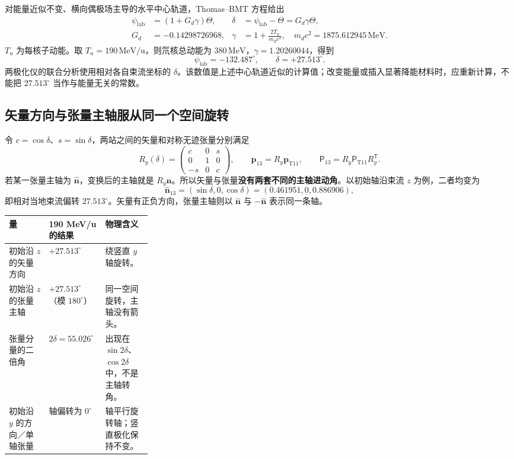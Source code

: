 \documentclass[UTF8,11pt,a4paper,fontset=none]{ctexart}
\newcommand{\pvec}{\bm p}
\newcommand{\Pt}{\mathsf P}
\begin{document}
对能量近似不变、横向偶极场主导的水平中心轨道，Thomas--BMT 方程给出\cite{bmt,constants}
\begin{align}
 \psi_{\mathrm{lab}}&=(1+G_d\gamma)\Theta,&
 \delta&=\psi_{\mathrm{lab}}-\Theta=G_d\gamma\Theta,\\
 G_d&=-0.14298726968,&
 \gamma&=1+\frac{2T_u}{m_dc^2},\quad m_dc^2=1875.612945\,\mathrm{MeV}.
\end{align}
$T_u$ 为每核子动能。取 $T_u=190\,\mathrm{MeV/u}$，则氘核总动能为 $380\,\mathrm{MeV}$，$\gamma=1.20260044$，得到
\begin{equation}
 \boxed{\psi_{\mathrm{lab}}=-132.487^\circ,\qquad
 \delta=+27.513^\circ.}
\end{equation}
两极化仪的联合分析使用相对各自束流坐标的 $\delta$。该数值是上述中心轨道近似的计算值；改变能量或插入显著降能材料时，应重新计算，不能把 $27.513^\circ$ 当作与能量无关的常数。

\subsection{矢量方向与张量主轴服从同一个空间旋转}

令 $c=\cos\delta$、$s=\sin\delta$，两站之间的矢量和对称无迹张量分别满足
\begin{equation}
 R_y(\delta)=\begin{pmatrix}c&0&s\\0&1&0\\-s&0&c\end{pmatrix},\qquad
 \pvec_{13}=R_y\pvec_{\mathrm{T11}},\qquad
 \Pt_{13}=R_y\Pt_{\mathrm{T11}}R_y^{\mathsf T}.
\end{equation}
若某一张量主轴为 $\hat{\bm n}$，变换后的主轴就是 $R_y\hat{\bm n}$。所以矢量与张量\textbf{没有两套不同的主轴进动角}。以初始轴沿束流 $z$ 为例，二者均变为
\begin{equation}
 \hat{\bm n}_{13}=(\sin\delta,0,\cos\delta)
 =(0.461951,0,0.886906),
\end{equation}
即相对当地束流偏转 $27.513^\circ$。矢量有正负方向，张量主轴则以 $\hat{\bm n}$ 与 $-\hat{\bm n}$ 表示同一条轴。

\begingroup\small\noindent
\begin{tabularx}{\linewidth}{@{}p{0.28\linewidth}YY@{}}
\toprule
量 & 190 MeV/u 的结果 & 物理含义 \\
\midrule
初始沿 $z$ 的矢量方向 & $+27.513^\circ$ & 绕竖直 $y$ 轴旋转。\\
初始沿 $z$ 的张量主轴 & $+27.513^\circ$（模 $180^\circ$） & 同一空间旋转，主轴没有箭头。\\
张量分量的二倍角 & $2\delta=55.026^\circ$ & 出现在 $\sin2\delta$、$\cos2\delta$ 中，不是主轴转角。\\
初始沿 $y$ 的方向／单轴张量 & 轴偏转为 $0^\circ$ & 轴平行旋转轴；竖直极化保持不变。\\
\bottomrule
\end{tabularx}
\endgroup
\end{document}
